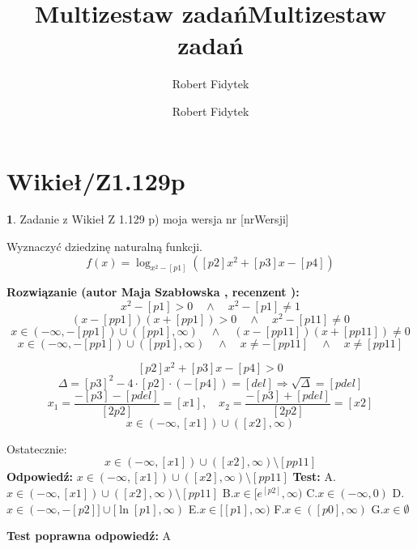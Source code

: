 \documentclass[12pt, a4paper]{article}
\title{Multizestaw zadań}
\author{Robert Fidytek}
\date{}\documentclass[12pt, a4paper]{article}
\title{Multizestaw zadań}
\author{Robert Fidytek}
\date{}
\theoremstyle{definition} %
\newtheorem{zad}{}
\theoremstyle{definition} %
\newtheorem{zad}{}
\newcommand{\kategoria}[1]{\section{#1}} %
\newcommand{\zadStart}[1]{\begin{zad}#1\newline} %
\newcommand{\zadStop}{\end{zad}}   %
\newcommand{\rozwStart}[2]{\noindent \textbf{Rozwiązanie (autor #1 , recenzent #2): }\newline} %
\newcommand{\rozwStop}{\newline}                                            %
\newcommand{\odpStart}{\noindent \textbf{Odpowiedź:}\newline}    %
\newcommand{\odpStop}{\newline}                                             %
\newcommand{\testStart}{\noindent \textbf{Test:}\newline} %
\newcommand{\testStop}{\newline} %
\newcommand{\kluczStart}{\noindent \textbf{Test poprawna odpowiedź:}\newline} %
\newcommand{\kluczStop}{\newline} %
\begin{document}
\maketitle


\kategoria{Wikieł/Z1.129p}
\zadStart{Zadanie z Wikieł Z 1.129 p) moja wersja nr [nrWersji]}

Wyznaczyć dziedzinę naturalną funkcji.
$$f(x)=\log_{x^{2}-[p1]}([p2]x^{2}+[p3]x-[p4])$$
\zadStop

\rozwStart{Maja Szabłowska}{}
$$x^{2}-[p1]>0 \quad \land \quad x^{2}-[p1]\neq 1 $$
$$(x-[pp1])(x+[pp1])>0 \quad \land \quad x^{2}-[p11]\neq0 $$
$$x\in(-\infty,-[pp1])\cup([pp1],\infty) \quad \land \quad (x-[pp11])(x+[pp11])\neq0$$
$$x\in(-\infty,-[pp1])\cup([pp1],\infty) \quad \land \quad x\neq-[pp11]\quad \land \quad x\neq[pp11]$$

$$[p2]x^{2}+[p3]x-[p4]>0$$
$$\Delta=[p3]^{2}-4\cdot[p2]\cdot(-[p4])=[del] \Rightarrow \sqrt{\Delta}=[pdel]$$
$$x_{1}=\frac{-[p3]-[pdel]}{[2p2]}=[x1], \quad x_{2}=\frac{-[p3]+[pdel]}{[2p2]}=[x2]$$
$$x\in(-\infty,[x1])\cup([x2],\infty)$$

Ostatecznie:
$$x\in(-\infty,[x1])\cup([x2],\infty)\setminus{[pp11]}$$
\rozwStop
\odpStart
$x\in(-\infty,[x1])\cup([x2],\infty)\setminus{[pp11]}$
\odpStop
\testStart
A.$x\in(-\infty,[x1])\cup([x2],\infty)\setminus{[pp11]}$
B.$x\in[e^{[p2]},\infty)$
C.$x\in(-\infty, 0)$
D.$x\in(-\infty, -[p2]] \cup [\ln[p1],\infty)$
E.$x\in[[p1],\infty)$
F.$x\in([p0],\infty)$
G.$x\in\emptyset$

\testStop
\kluczStart
A
\kluczStop
\end{document}
